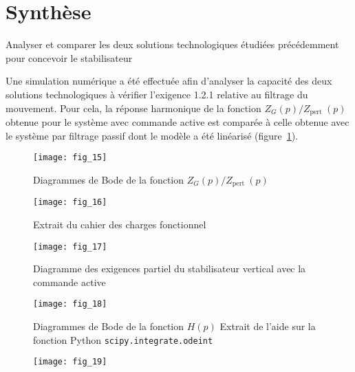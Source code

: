\section{\label{part:5}Synthèse}
\begin{obj}
Analyser et comparer les deux solutions technologiques étudiées précédemment pour concevoir le stabilisateur
\end{obj}
Une simulation numérique a été effectuée afin d'analyser la capacité des deux solutions technologiques à vérifier l'exigence 1.2.1 relative au filtrage du mouvement. Pour cela, la réponse harmonique de la fonction $Z_{G}(p) / Z_{\text {pert }}(p)$ obtenue pour le système avec commande active est comparée à celle obtenue avec le système par filtrage passif dont le modèle a été linéarisé (figure~\ref{fig:15}).

\begin{figure}[H]
\centering
\texttt{[image: fig\_15]}
\caption{\label{fig:15}  Diagrammes de Bode de la fonction $Z_{G}(p) / Z_{\text {pert }}(p)$}
\end{figure}



\ifprof
\begin{corrige}
\end{corrige}
\else
\fi

\ifprof
\begin{corrige}
\end{corrige}
\else
\fi



\begin{figure}[H]
\centering
\texttt{[image: fig\_16]}
\caption{\label{fig:A}  Extrait du cahier des charges fonctionnel}
\end{figure}

\begin{figure}[H]
\centering
\texttt{[image: fig\_17]}
\caption{\label{fig:B} Diagramme des exigences partiel du stabilisateur vertical avec la commande active}
\end{figure}

\begin{figure}[H]
\centering
\texttt{[image: fig\_18]}
\caption{\label{fig:C} Diagrammes de Bode de la fonction $H(p)$ Extrait de l'aide sur la fonction Python \texttt{scipy.integrate.odeint}}
\end{figure}

\begin{figure}[H]
\centering
\texttt{[image: fig\_19]}
\end{figure}

